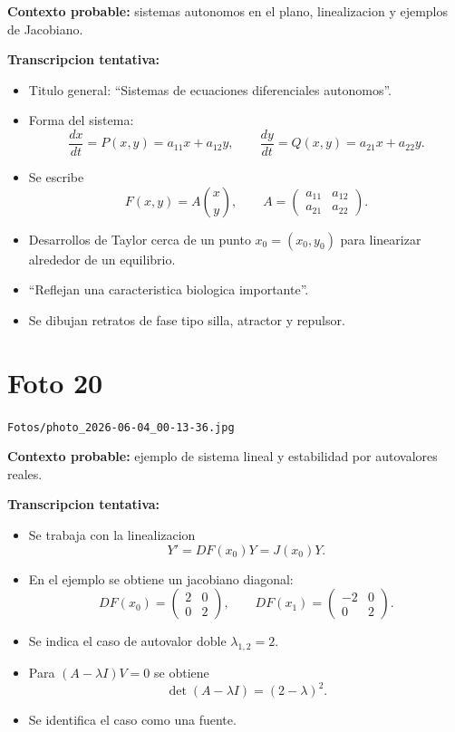 \documentclass[11pt,letterpaper]{article}
\begin{document}
\textbf{Contexto probable:} sistemas autonomos en el plano, linealizacion y ejemplos de Jacobiano.

\textbf{Transcripcion tentativa:}
\begin{itemize}[leftmargin=*]
    \item Titulo general: ``Sistemas de ecuaciones diferenciales autonomos''.
    \item Forma del sistema:
    \[
    \frac{dx}{dt}=P(x,y)=a_{11}x+a_{12}y,
    \qquad
    \frac{dy}{dt}=Q(x,y)=a_{21}x+a_{22}y.
    \]
    \item Se escribe
    \[
    F(x,y)=A\binom{x}{y},
    \qquad
    A=\begin{pmatrix}a_{11}&a_{12}\\ a_{21}&a_{22}\end{pmatrix}.
    \]
    \item Desarrollos de Taylor cerca de un punto \(x_0=(x_0,y_0)\) para linearizar alrededor de un equilibrio.
    \item ``Reflejan una caracteristica biologica importante''.
    \item Se dibujan retratos de fase tipo silla, atractor y repulsor.
\end{itemize}

\section*{Foto 20}
\texttt{Fotos/photo\_2026-06-04\_00-13-36.jpg}

\textbf{Contexto probable:} ejemplo de sistema lineal y estabilidad por autovalores reales.

\textbf{Transcripcion tentativa:}
\begin{itemize}[leftmargin=*]
    \item Se trabaja con la linealizacion
    \[
    Y' = DF(x_0)Y = J(x_0)Y.
    \]
    \item En el ejemplo se obtiene un jacobiano diagonal:
    \[
    DF(x_0)=
    \begin{pmatrix}
    2 & 0\\
    0 & 2
    \end{pmatrix},
    \qquad
    DF(x_1)=
    \begin{pmatrix}
    -2 & 0\\
    0 & 2
    \end{pmatrix}.
    \]
    \item Se indica el caso de autovalor doble \(\lambda_{1,2}=2\).
    \item Para \((A-\lambda I)V=0\) se obtiene
    \[
    \det(A-\lambda I)=(2-\lambda)^2.
    \]
    \item Se identifica el caso como una fuente.
\end{itemize}
\end{document}
